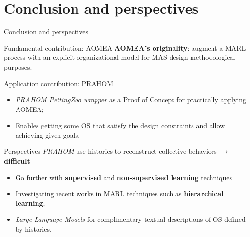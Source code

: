 \section{Conclusion and perspectives}
\begin{frame}{Conclusion and perspectives}
    {}

    \begin{prosblock}{Fundamental contribution: AOMEA}
        \textbf{AOMEA's originality}: augment a MARL process with an explicit organizational model for MAS design methodological purposes.
    \end{prosblock}

    \begin{prosblock}{Application contribution: PRAHOM}

        \begin{itemize}
            \item \emph{PRAHOM PettingZoo wrapper} as a Proof of Concept for practically applying AOMEA;
            \item Enables getting some OS that satisfy the design constraints and allow achieving given goals.
        \end{itemize}

    \end{prosblock}

    \begin{alertblock}{Perspectives}
        \emph{PRAHOM} use histories to reconstruct collective behaviors $\rightarrow$ \textbf{difficult}
        \begin{itemize}
            \item Go further with \textbf{supervised} and \textbf{non-supervised learning} techniques
            \item Investigating recent works in MARL techniques such as \textbf{hierarchical learning};
            \item \emph{Large Language Models} for complimentary textual descriptions of OS defined by histories.
        \end{itemize}
    \end{alertblock}

\end{frame}
